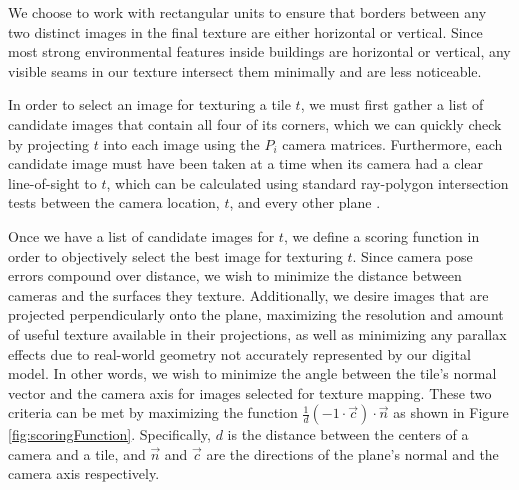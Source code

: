 \documentclass[]{spie}  %
\begin{document}
We choose to work with rectangular units to ensure that borders
between any two distinct images in the final texture are either
horizontal or vertical. Since most strong environmental features
inside buildings are horizontal or vertical, any visible seams in our
texture intersect them minimally and are less noticeable.

In order to select an image for texturing a tile $t$, we must first
gather a list of candidate images that contain all four of its
corners, which we can quickly check by projecting $t$ into each image
using the $P_i$ camera matrices. Furthermore, each candidate image
must have been taken at a time when its camera had a clear
line-of-sight to $t$, which can be calculated using standard
ray-polygon intersection tests between the camera location, $t$, and
every other plane \cite{rayintersection}.

Once we have a list of candidate images for $t$, we define a scoring
function in order to objectively select the best image for texturing
$t$. Since camera pose errors compound over distance, we wish to
minimize the distance between cameras and the surfaces they
texture. Additionally, we desire images that are projected
perpendicularly onto the plane, maximizing the resolution and amount
of useful texture available in their projections, as well as
minimizing any parallax effects due to real-world geometry not
accurately represented by our digital model. In other words, we wish
to minimize the angle between the tile's normal vector and the camera
axis for images selected for texture mapping. These two criteria can
be met by maximizing the function $\frac{1}{d} (-1 \cdot \vec{c})
\cdot \vec{n}$ as shown in Figure
\ref{fig:scoringFunction}. Specifically, $d$ is the distance between
the centers of a camera and a tile, and $\vec{n}$ and $\vec{c}$ are
the directions of the plane's normal and the camera axis respectively.
\end{document}
